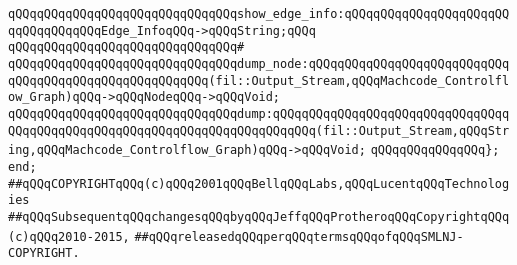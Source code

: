 \verb|qQQqqQQqqQQqqQQqqQQqqQQqqQQqqQQqshow_edge_info:qQQqqQQqqQQqqQQqqQQqqQQqqQQqqQQqqQQqEdge_InfoqQQq->qQQqString;qQQq|\newline
\verb|qQQqqQQqqQQqqQQqqQQqqQQqqQQqqQQq#|\newline
\verb|qQQqqQQqqQQqqQQqqQQqqQQqqQQqqQQqdump_node:qQQqqQQqqQQqqQQqqQQqqQQqqQQqqQQqqQQqqQQqqQQqqQQqqQQqqQQq(fil::Output_Stream,qQQqMachcode_Controlflow_Graph)qQQq->qQQqNodeqQQq->qQQqVoid;|\newline
\verb|qQQqqQQqqQQqqQQqqQQqqQQqqQQqqQQqdump:qQQqqQQqqQQqqQQqqQQqqQQqqQQqqQQqqQQqqQQqqQQqqQQqqQQqqQQqqQQqqQQqqQQqqQQqqQQq(fil::Output_Stream,qQQqString,qQQqMachcode_Controlflow_Graph)qQQq->qQQqVoid;|\newline
\newline
\verb|qQQqqQQqqQQqqQQq};|\newline
\verb|end;|\newline
\newline
\newline
\verb|##qQQqCOPYRIGHTqQQq(c)qQQq2001qQQqBellqQQqLabs,qQQqLucentqQQqTechnologies|\newline
\verb|##qQQqSubsequentqQQqchangesqQQqbyqQQqJeffqQQqProtheroqQQqCopyrightqQQq(c)qQQq2010-2015,|\newline
\verb|##qQQqreleasedqQQqperqQQqtermsqQQqofqQQqSMLNJ-COPYRIGHT.|\newline


